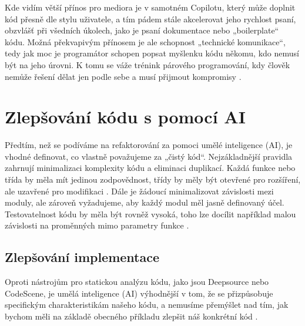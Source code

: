 \documentclass[FM,DP]{tulthesis}
\begin{document}
		Kde vidím větší přínos pro mediora je v samotném Copilotu, který může doplnit kód přesně dle stylu uživatele, a tím pádem stále akcelerovat jeho rychlost psaní, obzvlášť při všedních úkolech, jako je psaní dokumentace nebo „boilerplate“ kódu. Možná překvapivým přínosem je ale schopnost „technické komunikace“, tedy jak moc je programátor schopen popsat myšlenku kódu někomu, kdo nemusí být na jeho úrovni. K tomu se váže trénink párového programování, kdy člověk nemůže řešení dělat jen podle sebe a musí přijmout kompromisy \cite{wikipedia:tech_comm}.
		
		\section{Zlepšování kódu s pomocí AI}
		Předtím, než se podíváme na refaktorování za pomoci umělé inteligence (AI), je vhodné definovat, co vlastně považujeme za „čistý kód“. Nejzákladnější pravidla zahrnují minimalizaci komplexity kódu a eliminaci duplikací. Každá funkce nebo třída by měla mít jedinou zodpovědnost, třídy by měly být otevřené pro rozšíření, ale uzavřené pro modifikaci \cite{wikipedia:dry} \cite{wikipedia:kiss} \cite{wikipedia:solid}. Dále je žádoucí minimalizovat závislosti mezi moduly, ale zároveň vyžadujeme, aby každý modul měl jasně definovaný účel. Testovatelnost kódu by měla být rovněž vysoká, toho lze docílit například malou závislosti na proměnných mimo parametry funkce \cite{gfg:coh_coup}.
		
		\subsection{Zlepšování implementace}
		Oproti nástrojům pro statickou analýzu kódu, jako jsou Deepsource nebo CodeScene, je umělá inteligence (AI) výhodnější v tom, že se přizpůsobuje specifickým charakteristikám našeho kódu, a nemusíme přemýšlet nad tím, jak bychom měli na základě obecného příkladu zlepšit náš konkrétní kód \cite{deepsource} \cite{codescene}.
		
\end{document}
